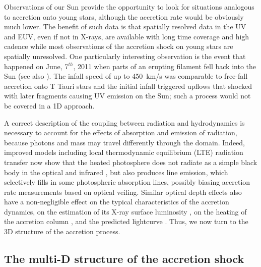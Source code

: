 \documentclass[graybox, nosecnum]{svmult}
\begin{document}
Observations of our Sun provide the opportunity to look for situations analogous to accretion onto young stars, although the accretion rate would be obviously much lower. The benefit of such data is that spatially resolved data in the UV and EUV, even if not in X-rays, are available with long time coverage and high cadence while most observations of the accretion shock on young stars are spatially unresolved. One particularly interesting observation is the event that happened on June, 7$^{th}$, 2011 when parts of an erupting filament fell back into the Sun \cite{2013Sci...341..251R} (see also \cite{Reale_2014}). The infall speed of up to 450~km/s was comparable to free-fall accretion onto T Tauri stars and the initial infall triggered upflows that shocked with later fragments causing UV emission on the Sun; such a process would not be covered in a 1D approach.



A correct description of the coupling between radiation and hydrodynamics is necessary to account for the effects of absorption and emission of radiation, because photons and mass may travel differently through the domain. Indeed, improved models including local thermodynamic equilibrium (LTE) radiation transfer now show that the heated photosphere does not radiate as a simple black body in the optical and infrared \cite{Dodin_2012,Dodin_2013}, but also produces line emission, which selectively fills in some photospheric absorption lines, possibly biasing accretion rate measurements based on optical veiling.
Similar optical depth effects also
have a non-negligible effect on the typical characteristics of the 
accretion dynamics, on the estimation of its X-ray surface luminosity 
\cite{Sa_2019}, on the heating of the accretion column \cite{1999AstL...25..430L,Costa_2017}, and the predicted lightcurve \cite{2021ApJ...908...16R}. Thus, we now turn to the 3D structure of the accretion process.

\subsection{The multi-D structure of the accretion shock}
\end{document}
